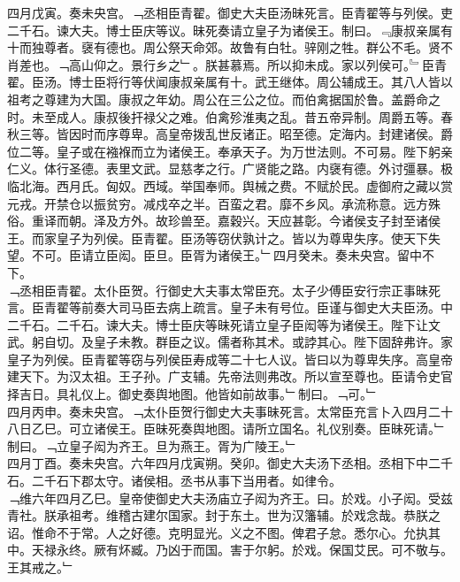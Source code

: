 \documentclass{zhvt-classic}
\begin{document}
\hspace*{2em}四月戊寅。奏未央宫。﹁丞相臣青翟。御史大夫臣汤昧死言。臣青翟等与列侯。吏二千石。谏大夫。博士臣庆等议。昧死奏请立皇子为诸侯王。制曰。﹃康叔亲属有十而独尊者。襃有德也。周公祭天命郊。故鲁有白牡。骍刚之牲。群公不毛。贤不肖差也。﹁高山仰之。景行乡之﹂。朕甚慕焉。所以抑未成。家以列侯可。﹄臣青翟。臣汤。博士臣将行等伏闻康叔亲属有十。武王继体。周公辅成王。其八人皆以祖考之尊建为大国。康叔之年幼。周公在三公之位。而伯禽据国於鲁。盖爵命之时。未至成人。康叔後扞禄父之难。伯禽殄淮夷之乱。昔五帝异制。周爵五等。春秋三等。皆因时而序尊卑。高皇帝拨乱世反诸正。昭至德。定海内。封建诸侯。爵位二等。皇子或在襁褓而立为诸侯王。奉承天子。为万世法则。不可易。陛下躬亲仁义。体行圣德。表里文武。显慈孝之行。广贤能之路。内襃有德。外讨彊暴。极临北海。西月氏。匈奴。西域。举国奉师。舆械之费。不赋於民。虚御府之藏以赏元戎。开禁仓以振贫穷。减戍卒之半。百蛮之君。靡不乡风。承流称意。远方殊俗。重译而朝。泽及方外。故珍兽至。嘉穀兴。天应甚彰。今诸侯支子封至诸侯王。而家皇子为列侯。臣青翟。臣汤等窃伏孰计之。皆以为尊卑失序。使天下失望。不可。臣请立臣闳。臣旦。臣胥为诸侯王。﹂四月癸未。奏未央宫。留中不下。\\
\hspace*{2em}﹁丞相臣青翟。太仆臣贺。行御史大夫事太常臣充。太子少傅臣安行宗正事昧死言。臣青翟等前奏大司马臣去病上疏言。皇子未有号位。臣谨与御史大夫臣汤。中二千石。二千石。谏大夫。博士臣庆等昧死请立皇子臣闳等为诸侯王。陛下让文武。躬自切。及皇子未教。群臣之议。儒者称其术。或誖其心。陛下固辞弗许。家皇子为列侯。臣青翟等窃与列侯臣寿成等二十七人议。皆曰以为尊卑失序。高皇帝建天下。为汉太祖。王子孙。广支辅。先帝法则弗改。所以宣至尊也。臣请令史官择吉日。具礼仪上。御史奏舆地图。他皆如前故事。﹂制曰。﹁可。﹂\\
\hspace*{2em}四月丙申。奏未央宫。﹁太仆臣贺行御史大夫事昧死言。太常臣充言卜入四月二十八日乙巳。可立诸侯王。臣昧死奏舆地图。请所立国名。礼仪别奏。臣昧死请。﹂\\
\hspace*{2em}制曰。﹁立皇子闳为齐王。旦为燕王。胥为广陵王。﹂\\
\hspace*{2em}四月丁酉。奏未央宫。六年四月戊寅朔。癸卯。御史大夫汤下丞相。丞相下中二千石。二千石下郡太守。诸侯相。丞书从事下当用者。如律令。\\
\hspace*{2em}﹁维六年四月乙巳。皇帝使御史大夫汤庙立子闳为齐王。曰。於戏。小子闳。受兹青社。朕承祖考。维稽古建尔国家。封于东土。世为汉籓辅。於戏念哉。恭朕之诏。惟命不于常。人之好德。克明显光。义之不图。俾君子怠。悉尔心。允执其中。天禄永终。厥有炋臧。乃凶于而国。害于尔躬。於戏。保国艾民。可不敬与。王其戒之。﹂\\
\end{document}
